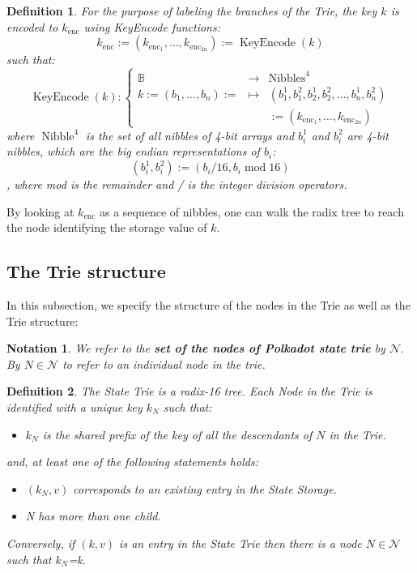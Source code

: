 \documentclass{article}
\newcommand{\assign}{:=}
\newcommand{\nosymbol}{}
\newcommand{\tmop}[1]{\ensuremath{\operatorname{#1}}}
\newcommand{\tmstrong}[1]{\textbf{#1}}
\newcommand{\tmtextbf}[1]{{\bfseries{#1}}}
\newenvironment{itemizeminus}{\begin{itemize} \renewcommand{\labelitemi}{$-$}\renewcommand{\labelitemii}{$-$}\renewcommand{\labelitemiii}{$-$}\renewcommand{\labelitemiv}{$-$}}{\end{itemize}}
\newtheorem{definition}{Definition}
\newtheorem{notation}{Notation}
\providecommand{\nosymbol}{}
\providecommand{\tmop}[1]{\ensuremath{\mathrm{#1}}}
\providecommand{\tmstrong}[1]{\tmtextbf{#1}}
\providecommand{\tmtextbf}[1]{\tmtextbf{#1}}
\newtheorem{definition}{Definition}
\newtheorem{notation}{Notation}
\begin{document}
\begin{definition}
  For the purpose of labeling the branches of the Trie, the key $k$ is encoded
  to $k_{\tmop{enc}}$ using KeyEncode functions:
  \begin{equation}
    k_{\tmop{enc}} \assign (k_{\tmop{enc}_1}, \ldots, k_{\tmop{enc}_{2 n}})
    \assign \tmop{KeyEncode} (k) \label{key-encode-in-trie}
  \end{equation}
  such that:
  \[ \tmop{KeyEncode} (k) : \left\{ \begin{array}{lll}
       \mathbb{B}^{\nosymbol} & \rightarrow & \tmop{Nibbles}^4\\
       k \assign (b_1, \ldots, b_n) \assign & \mapsto & (b^1_1, b^2_1, b_2^1,
       b^2_2, \ldots, b^1_n, b^2_n)\\
       &  & \assign (k_{\tmop{enc}_1}, \ldots, k_{\tmop{enc}_{2 n}})
     \end{array} \right. \]
  where $\tmop{Nibble}^4$ is the set of all nibbles of 4-bit arrays and
  $b^1_i$ and $b^2_i$ are 4-bit nibbles, which are the big endian
  representations of $b_i$:
  \[ (b^1_i, b^2_i) \assign (b_i / 16, b_i \tmop{mod} 16) \]
  , where mod is the remainder and / is the integer division operators.
\end{definition}

By looking at $k_{\tmop{enc}}$ as a sequence of nibbles, one can walk the
radix tree to reach the node identifying the storage value of $k$.

\subsection{The Trie structure}

In this subsection, we specify the structure of the nodes in the Trie as well
as the Trie structure:

\begin{notation}
  We refer to the {\tmstrong{set of the nodes of Polkadot state trie}} by
  $\mathcal{N}.$ By $N \in \mathcal{N}$ to refer to an individual node in the
  trie.
\end{notation}

\begin{definition}
  \label{defn-nodetype}The State Trie is a radix-16 tree. Each Node in the
  Trie is identified with a unique key $k_N$ such that:
  \begin{itemizeminus}
    \item $k_N$ is the shared prefix of the key of all the descendants of $N$
    in the Trie.
  \end{itemizeminus}
  and, at least one of the following statements holds:
  \begin{itemizeminus}
    \item $(k_N, v)$ corresponds to an existing entry in the State Storage.
    
    \item N has more than one child.
  \end{itemizeminus}
  Conversely, if $(k, v)$ is an entry in the State Trie then there is a node
  $N \in \mathcal{N}$ such that $k_N$=k.
\end{definition}
\end{document}
